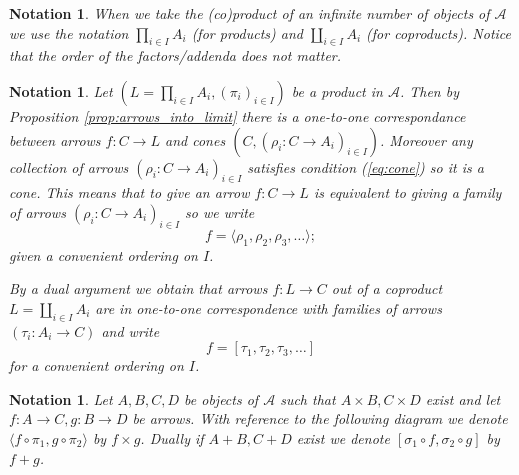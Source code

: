 \documentclass[letterpaper, 11pt, oneside]{memoir}
\theoremstyle{myteo}
\newtheorem{notation}[theorem]{Notation}
\numberwithin{equation}{section}
\newcommand{\marginnote}[1]{\marginpar{\footnotesize #1}}
\newcommand{\A}{\mathscr{A}}
\begin{document}
\begin{notation}
  When we take the (co)product of an infinite number of objects of \(\A\) we use the notation \(\prod_{i\in I}A_i\) (for products) and \(\coprod_{i \in I}A_i\) (for coproducts).
  Notice that the order of the factors/addenda does not matter.
\end{notation}

\begin{notation}
  \label{not:brackets}
  Let \((L = \prod_{i\in I}A_i, (\pi_i)_{i \in I})\) be a product in \(\A\).
  Then by Proposition \ref{prop:arrows_into_limit} there is a one-to-one correspondance between arrows \(f \colon C \to L\) and cones \((C, (\rho_i\colon C \to A_i)_{i \in I})\).
  Moreover any collection of arrows \((\rho_i \colon C \to A_i)_{i \in I}\) satisfies condition (\ref{eq:cone}) so it is a cone.
  This means that to give an arrow \(f \colon C \to L\) is equivalent to giving a family of arrows \((\rho_i \colon C \to A_i)_{i \in I}\) so we write
  \begin{equation}
    f = \langle\rho_1, \rho_2, \rho_3, \ldots\rangle;
  \end{equation}
  given a convenient ordering on \(I\).

  By a dual argument we obtain that arrows \(f \colon L \to C\) out of a coproduct \(L = \coprod_{i \in I}A_i\) are in one-to-one correspondence with families of arrows \((\tau_i \colon A_i \to C)\) and write
  \begin{equation}
    f = [\tau_1, \tau_2, \tau_3, \ldots]
  \end{equation}
  for a convenient ordering on \(I\).
\end{notation}

\begin{notation}
  \label{not:product_arrows}
  Let \(A,B,C,D\) be objects of \(\A\) such that \(A \times B, C \times D\) exist and let \(f \colon A \to C, g \colon B \to D\) be arrows.
  With reference to the following diagram we denote \(\langle f \circ \pi_1, g \circ \pi_2\rangle\) by \(f \times g\).
  Dually if \(A + B, C + D\) exist we denote \([\sigma_1 \circ f, \sigma_2 \circ g]\) by \(f + g\).
  \marginnote{\(f \times g\), \(f + g\)}
  \begin{center}
    \quad
  \end{center}
\end{notation}
\end{document}
